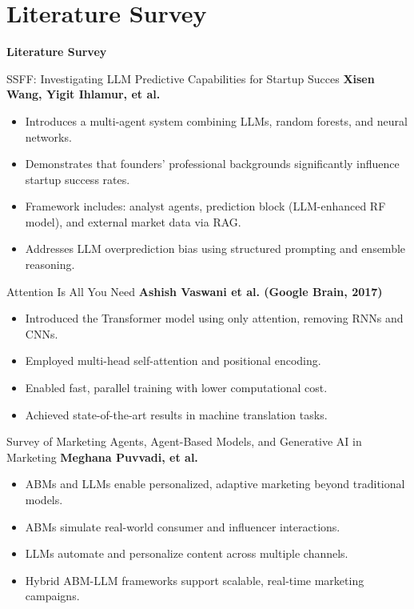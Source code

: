 \documentclass{beamer}
\begin{document}
\section{Literature Survey}

\begin{frame}
\centering
\Huge \textbf{Literature Survey}
\end{frame}


\begin{frame}{SSFF: Investigating LLM Predictive Capabilities for Startup Succes}
\large\textbf{Xisen Wang, Yigit Ihlamur, et al.}

\normalsize
\begin{itemize}
  \item Introduces a multi-agent system combining LLMs, random forests, and neural networks.
    \item Demonstrates that founders' professional backgrounds significantly influence startup success rates.

    \item Framework includes: analyst agents, prediction block (LLM-enhanced RF model), and external market data via RAG.
    \item Addresses LLM overprediction bias using structured prompting and ensemble reasoning.
\end{itemize}

\end{frame}

\begin{frame}{Attention Is All You Need}
\large\textbf{Ashish Vaswani et al. (Google Brain, 2017)}

\normalsize
\begin{itemize}
  \item Introduced the Transformer model using only attention, removing RNNs and CNNs.
    \item Employed multi-head self-attention and positional encoding.
    \item Enabled fast, parallel training with lower computational cost.
    \item Achieved state-of-the-art results in machine translation tasks.
\end{itemize}
\end{frame}


\begin{frame}{Survey of Marketing Agents, Agent-Based Models, and Generative AI in Marketing    }
\large\textbf{Meghana Puvvadi, et al.}

\normalsize
\begin{itemize}
   \item ABMs and LLMs enable personalized, adaptive marketing beyond traditional models.
    \item ABMs simulate real-world consumer and influencer interactions.
    \item LLMs automate and personalize content across multiple channels.
    \item Hybrid ABM-LLM frameworks support scalable, real-time marketing campaigns.
\end{itemize}
\end{frame}
\end{document}
